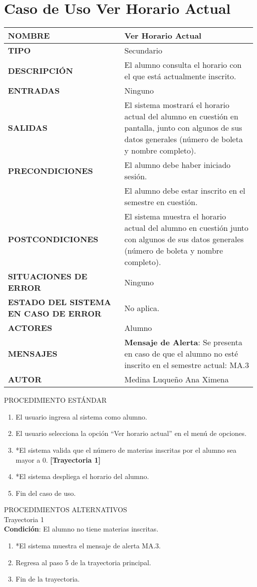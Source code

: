 \newpage
\section{Caso de Uso Ver Horario Actual}
\begin{longtable}{ | p{6cm} | p{10cm} |}
\hline
\textbf{NOMBRE} & Ver Horario Actual\\
\hline
\textbf{TIPO} & Secundario\\
\hline
\textbf{DESCRIPCIÓN} & El alumno consulta el horario con el que está actualmente inscrito.\\
\hline
\textbf{ENTRADAS} & Ninguno\\
\hline
\textbf{SALIDAS} & El sistema mostrará el horario actual del alumno en cuestión en pantalla, junto con algunos de sus datos generales (número de boleta y nombre completo).\\
\hline
\textbf{PRECONDICIONES} & El alumno debe haber iniciado sesión.\\ & El alumno debe estar inscrito en el semestre en cuestión.\\
\hline
\textbf{POSTCONDICIONES} & El sistema muestra el horario actual del alumno en cuestión junto con algunos de sus datos generales (número de boleta y nombre completo).\\
\hline
\textbf{SITUACIONES DE ERROR} & Ninguno\\
\hline
\textbf{ESTADO DEL SISTEMA EN CASO DE ERROR} & No aplica.\\
\hline
\textbf{ACTORES} & Alumno\\
\hline
\textbf{MENSAJES} & \textbf{Mensaje de Alerta}: Se presenta en caso de que el alumno no esté inscrito en el semestre actual: MA.3\\
\hline
\textbf{AUTOR} & Medina Luqueño Ana Ximena\\
\hline
\end{longtable}
\vspace*{1cm}
\noindent
\Large{PROCEDIMIENTO ESTÁNDAR}
\large{}
\begin{enumerate}
    \item El usuario ingresa al sistema como alumno.
    \item El usuario selecciona la opción “Ver horario actual” en el menú de opciones.
    \item *El sistema valida que el número de materias inscritas por el alumno sea mayor a 0. \textbf{[Trayectoria 1]}
    \item *El sistema despliega el horario del alumno.
    \item Fin del caso de uso.
\end{enumerate}
\newpage
\noindent
\Large{PROCEDIMIENTOS ALTERNATIVOS}\\
\large{Trayectoria 1}\\
\textbf{Condición}: El alumno no tiene materias inscritas.
\begin{enumerate}
    \item *El sistema muestra el mensaje de alerta MA.3.
    \item Regresa al paso 5 de la trayectoria principal.
    \item Fin de la trayectoria. 
\end{enumerate}